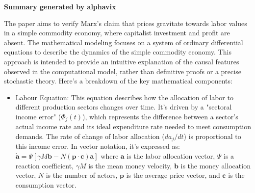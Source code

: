 \textbf{Summary generated by alphavix}

The paper aims to verify Marx's claim that prices gravitate towards labor values in a simple commodity economy, where capitalist investment and profit are absent. The mathematical modeling focuses on a system of ordinary differential equations to describe the dynamics of the simple commodity economy. This approach is intended to provide an intuitive explanation of the causal features observed in the computational model, rather than definitive proofs or a precise stochastic theory. Here's a breakdown of the key mathematical components:
\begin{itemize}
    \item Labour Equation: This equation describes how the allocation of labor to different production sectors changes over time. It's driven by a "sectoral income error" ($\Phi_j(t)$), which represents the difference between a sector's actual income rate and its ideal expenditure rate needed to meet consumption demands. The rate of change of labor allocation ($d a_j / dt$) is proportional to this income error. In vector notation, it's expressed as: $\dot{\mathbf{a}} = \Psi[\gamma M\mathbf{b} - N(\mathbf{p} \cdot \mathbf{c})\mathbf{a}]$ where $\mathbf{a}$ is the labor allocation vector, $\Psi$ is a reaction coefficient, $\gamma M$ is the mean money velocity, $\mathbf{b}$ is the money allocation vector, $N$ is the number of actors, $\mathbf{p}$ is the average price vector, and $\mathbf{c}$ is the consumption vector.


\end{itemize}
